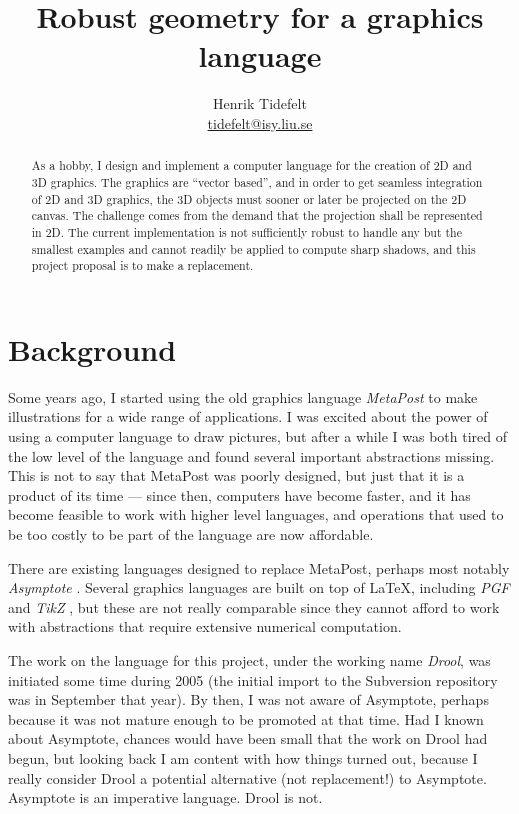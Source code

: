 \documentclass[a4paper]{article}
\title{Robust geometry for a graphics language}
\author{Henrik Tidefelt\\
\href{mailto:tidefelt@isy.liu.se}{\url{tidefelt@isy.liu.se}}}
\begin{document}
\maketitle

\begin{abstract}
  As a hobby, I design and implement a computer language for the creation of 2D and 3D graphics.  The graphics are ``vector based'', and in order to get seamless integration of 2D and 3D graphics, the 3D objects must sooner or later be projected on the 2D canvas.  The challenge comes from the demand that the projection shall be represented in 2D.  The current implementation is not sufficiently robust to handle any but the smallest examples and cannot readily be applied to compute sharp shadows, and this project proposal is to make a replacement.
\end{abstract}

\section*{Background}%
%
Some years ago, I started using the old graphics language \emph{MetaPost} \citep{Hobby94MetaPost} to make illustrations for a wide range of applications.  I was excited about the power of using a computer language to draw pictures, but after a while I was both tired of the low level of the language and found several important abstractions missing.  This is not to say that MetaPost was poorly designed, but just that it is a product of its time --- since then, computers have become faster, and it has become feasible to work with higher level languages, and operations that used to be too costly to be part of the language are now affordable.

There are existing languages designed to replace MetaPost, perhaps most notably \emph{Asymptote} \citep{Asymptote_1.29}.  Several graphics languages are built on top of \LaTeX{}, including \emph{PGF} and \emph{TikZ} \citep{TikZ_PGF_1.00}, but these are not really comparable since they cannot afford to work with abstractions that require extensive numerical computation.

The work on the language for this project, under the working name \emph{Drool}, was initiated some time during 2005 (the initial import to the Subversion repository was in September that year).  By then, I was not aware of Asymptote, perhaps because it was not mature enough to be promoted at that time.  Had I known about Asymptote, chances would have been small that the work on Drool had begun, but looking back I am content with how things turned out, because I really consider Drool a potential alternative (not replacement!) to Asymptote.  Asymptote is an imperative language.  Drool is not.
\end{document}
